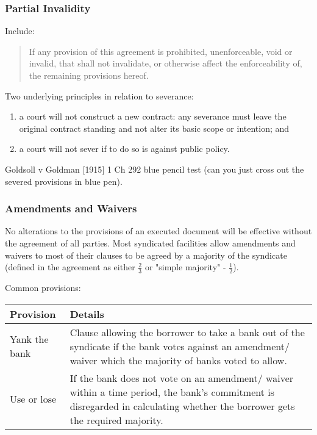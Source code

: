 \documentclass[
]{article}
\providecommand{\tightlist}{%
  \setlength{\itemsep}{0pt}\setlength{\parskip}{0pt}}
\begin{document}
\hypertarget{partial-invalidity}{%
\subsubsection{Partial Invalidity}\label{partial-invalidity}}

Include:

\begin{quote}
If any provision of this agreement is prohibited, unenforceable, void or
invalid, that shall not invalidate, or otherwise affect the
enforceability of, the remaining provisions hereof.
\end{quote}

Two underlying principles in relation to severance:

\begin{enumerate}
\tightlist
\item
  a court will not construct a new contract: any severance must leave
  the original contract standing and not alter its basic scope or
  intention; and
\item
  a court will not sever if to do so is against public policy.
\end{enumerate}

Goldsoll v Goldman {[}1915{]} 1 Ch 292 blue pencil test (can you just
cross out the severed provisions in blue pen).

\hypertarget{amendments-and-waivers}{%
\subsubsection{Amendments and Waivers}\label{amendments-and-waivers}}

No alterations to the provisions of an executed document will be
effective without the agreement of all parties. Most syndicated
facilities allow amendments and waivers to most of their clauses to be
agreed by a majority of the syndicate (defined in the agreement as
either {\(\frac{2}{3}\)} or "simple majority" - {\(\frac{1}{2}\)}).

Common provisions:

\begin{longtable}[]{@{}ll@{}}
\toprule()
Provision & Details \\
\midrule()
\endhead
Yank the bank & Clause allowing the borrower to take a bank out of the
syndicate if the bank votes against an amendment/ waiver which the
majority of banks voted to allow. \\
Use or lose & If the bank does not vote on an amendment/ waiver within a
time period, the bank's commitment is disregarded in calculating whether
the borrower gets the required majority. \\
\bottomrule()
\end{longtable}
\end{document}
